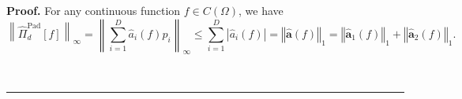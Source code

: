 \documentclass[10pt,a4paper]{amsart}
\newenvironment{proof}[1][Proof]{\noindent\textbf{#1.} }{\ \rule{0.5em}{0.5em}}
\begin{document}
\begin{proof}
For any continuous function $f\in C(\Omega)$, we have
	\begin{equation} \label{eq:comoda}
\left\lVert \hat{\Pi}_d^{\mathrm{Pad}} [f] \right\rVert_\infty = \left\lVert \sum_{i=1}^D \hat{{a}}_i (f) p_i \right\rVert_\infty \leq \sum_{i=1}^D \left\lvert \hat{{a}}_i (f) \right\rvert = \left\Vert \hat{\boldsymbol{a}} (f) \right\Vert_1 = \left\Vert \hat{\boldsymbol{a}}_1 (f) \right\Vert_1 + \left\Vert \hat{\boldsymbol{a}}_2 (f) \right\Vert_1.
		\end{equation}

\end{proof}
\end{document}
